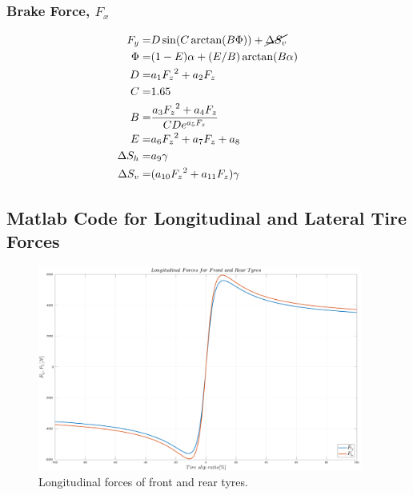 \documentclass[12pt]{article}
\begin{document}
\subsubsection{Brake Force, $F_x$}
\begin{subequations}
	\begin{align}
	\label{eqn:tire_brake_force}  
	F_y =& D\sin(C\arctan(B\Phi))  + \cancel{\Delta{S_v}} \\
	\Phi =& (1-E)\alpha+(E/B)\arctan(B\alpha) \\
	D =& a_1{F_z}^2 + a_2{F_z}\\
	C =& 1.65 \\
	B =& \frac{a_3{F_z}^{2} + a_4{F_z}}{CDe^{a_5{F_z}}}\\
	E =& a_6{F_z}^{2} + a_7{F_z} + a_8 \\
	\Delta{S_h} =& a_9\gamma \\
	\Delta{S_v} =& (a_{10}{F_z}^{2}+ a_{11}F_z)\gamma
	\end{align}
\end{subequations} 
\subsection{Matlab Code for Longitudinal and Lateral Tire Forces}

\begin{figure}[h]
	\centering
	\includegraphics[width=0.95\textwidth,keepaspectratio]{images/Longitudinal-Forces.pdf}
	\caption{Longitudinal forces of front and rear tyres.}
	\label{fig_04:longitudional_forces}
\end{figure}
\end{document}
